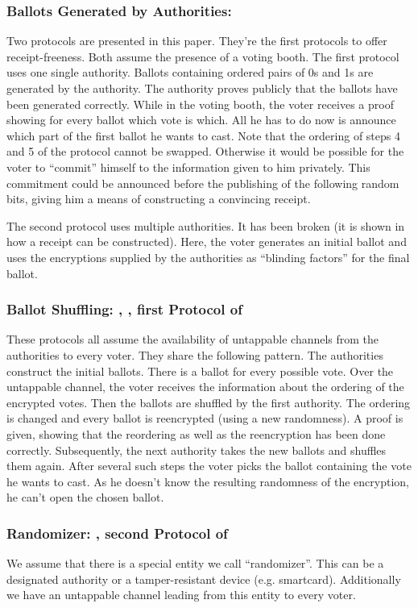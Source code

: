 \documentclass{article}
\begin{document}
\subsubsection{Ballots Generated by Authorities: \cite{BenTui94}}
Two protocols are presented in this paper. They're the first protocols to offer receipt-freeness. Both assume the presence of a voting booth.
The first protocol uses one single authority. Ballots containing ordered pairs of 0s and 1s are generated by the authority. The authority proves publicly that the ballots have been generated correctly. While in the voting booth, the voter receives a proof showing for every ballot which vote is which. All he has to do now is announce which part of the first ballot he wants to cast.
Note that the ordering of steps 4 and 5 of the protocol cannot be swapped. Otherwise it would be possible for the voter to ``commit'' himself to the information given to him privately. This commitment could be announced before the publishing of the following random bits, giving him a means of constructing a convincing receipt.

The second protocol uses multiple authorities. It has been broken (it is shown in \cite{HirSak00} how a receipt can be constructed). Here, the voter generates an initial ballot and uses the encryptions supplied by the authorities as ``blinding factors'' for the final ballot.


\subsubsection{Ballot Shuffling: \cite{SakKil95}, \cite{HirSak00}, first Protocol of \cite{Hirt01}}
These protocols all assume the availability of untappable channels from the authorities to every voter. They share the following pattern.
The authorities construct the initial ballots. There is a ballot for every possible vote. Over the untappable channel, the voter receives the information about the ordering of the encrypted votes. Then the ballots are shuffled by the first authority. The ordering is changed and every ballot is reencrypted (using a new randomness). A proof is given, showing that the reordering as well as the reencryption has been done correctly. Subsequently, the next authority takes the new ballots and shuffles them again. After several such steps the voter picks the ballot containing the vote he wants to cast. As he doesn't know the resulting randomness of the encryption, he can't open the chosen ballot.


\subsubsection{Randomizer: \cite{BPPSF01}, second Protocol of \cite{Hirt01}}
We assume that there is a special entity we call ``randomizer''. This can be a designated authority or a tamper-resistant device (e.g. smartcard). Additionally we have an untappable channel leading from this entity to every voter.
\end{document}
